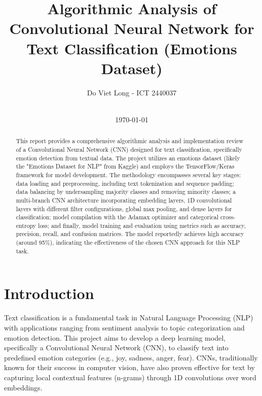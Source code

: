 \documentclass[twocolumn]{article}
\title{Algorithmic Analysis of Convolutional Neural Network for Text Classification (Emotions Dataset)}
\author{Do Viet Long - ICT 2440037}
\date{\\ \today}
\begin{document}
\maketitle

\begin{abstract}
This report provides a comprehensive algorithmic analysis and implementation review of a Convolutional Neural Network (CNN) designed for text classification, specifically emotion detection from textual data. The project utilizes an emotions dataset (likely the "Emotions Dataset for NLP" from Kaggle) and employs the TensorFlow/Keras framework for model development. The methodology encompasses several key stages: data loading and preprocessing, including text tokenization and sequence padding; data balancing by undersampling majority classes and removing minority classes; a multi-branch CNN architecture incorporating embedding layers, 1D convolutional layers with different filter configurations, global max pooling, and dense layers for classification; model compilation with the Adamax optimizer and categorical cross-entropy loss; and finally, model training and evaluation using metrics such as accuracy, precision, recall, and confusion matrices. The model reportedly achieves high accuracy (around 95\%), indicating the effectiveness of the chosen CNN approach for this NLP task.
\end{abstract}

\section{Introduction}
Text classification is a fundamental task in Natural Language Processing (NLP) with applications ranging from sentiment analysis to topic categorization and emotion detection. This project aims to develop a deep learning model, specifically a Convolutional Neural Network (CNN), to classify text into predefined emotion categories (e.g., joy, sadness, anger, fear). CNNs, traditionally known for their success in computer vision, have also proven effective for text by capturing local contextual features (n-grams) through 1D convolutions over word embeddings. 
\end{document}
